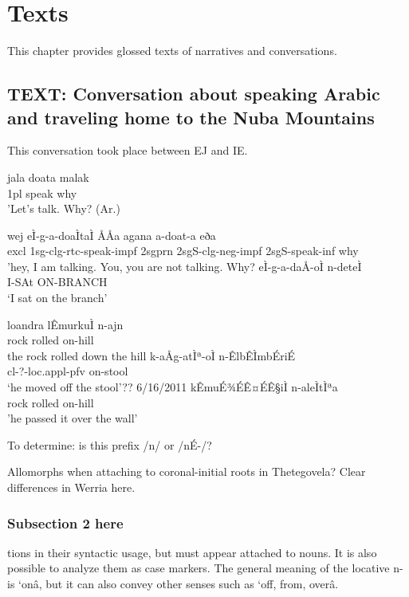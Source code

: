 \chapter{Texts}

This chapter provides glossed texts of narratives and conversations.  

\section{TEXT: Conversation about speaking Arabic and traveling home to the Nuba Mountains}

This conversation took place between EJ and IE. 

\ea  \gll jala doata malak		\\	
		   1pl speak why\\
		\glt 'Let's talk. Why? (Ar.)	
		
\ex \gll wej eÌ-g-a-doaÌtaÌ ÅÅa agana a-doat-a eða		\\	
		   excl 1sg-clg-rtc-speak-impf 2sgprn 2sgS-clg-neg-impf 2sgS-speak-inf why\\
		\glt 'hey, I am talking. You, you are not talking. Why?	
\ea \gll eÌ-g-a-daÅ-oÌ n-deteÌ		\\	
			I-SAt ON-BRANCH\\
		\glt `I sat on the branch'	

\ex \gll loandra lÊmurkuÌ n-ajn		 \\
			rock rolled on-hill\\
		\glt the rock rolled down the hill
	\ex \gll k-aÅg-atÌª-oÌ n-ÊlbÊÌmbÉriÉ	\\	
			cl-?-loc.appl-pfv on-stool\\
	\glt 	`he moved off the stool'??	6/16/2011 %
	\ex		kÊmuÉ¾ÉÊ¤ÉÊ§iÌ n-aleÌtÌªa	\\
			rock rolled on-hill\\
			'he passed it over the wall'
	\z
\z 

To determine: is this prefix /n/ or /nÉ-/?

Allomorphs when attaching to coronal-initial roots in Thetegovela? Clear differences in Werria here.

\subsection{Subsection 2 here}

tions in their syntactic usage, but must appear attached to nouns. It is also possible to analyze them as case markers. The general meaning of the locative n- is `onâ, but it can also convey other senses such as `off, from, overâ.  

